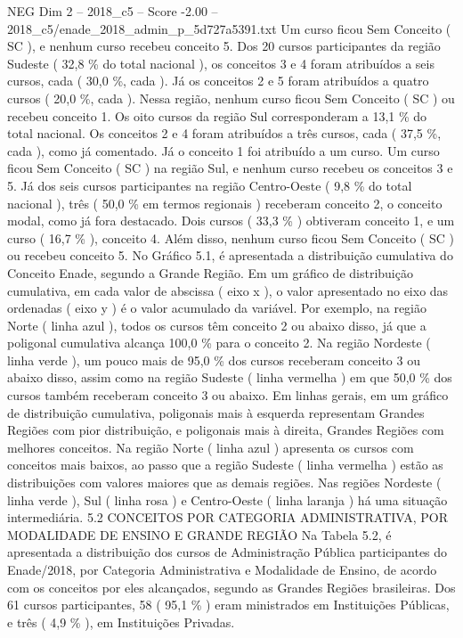 \begin{textsample}{NEG Dim 2 – 2018\_c5 – Score -2.00 – 2018\_c5/enade\_2018\_admin\_p\_5d727a5391.txt}
Um curso ficou Sem Conceito ( SC ), e nenhum curso recebeu conceito 5.
Dos 20 cursos participantes da região Sudeste ( 32,8 \% do total nacional ), os conceitos 3 e 4 foram atribuídos a seis cursos, cada ( 30,0 \%, cada ).
Já os conceitos 2 e 5 foram atribuídos a quatro cursos ( 20,0 \%, cada ).
Nessa região, nenhum curso ficou Sem Conceito ( SC ) ou recebeu conceito 1.
Os oito cursos da região Sul corresponderam a 13,1 \% do total nacional.
Os conceitos 2 e 4 foram atribuídos a três cursos, cada ( 37,5 \%, cada ), como já comentado.
Já o conceito 1 foi atribuído a um curso.
Um curso ficou Sem Conceito ( SC ) na região Sul, e nenhum curso recebeu os conceitos 3 e 5.
Já dos seis cursos participantes na região Centro-Oeste ( 9,8 \% do total nacional ), três ( 50,0 \% em termos regionais ) receberam conceito 2, o conceito modal, como já fora destacado.
Dois cursos ( 33,3 \% ) obtiveram conceito 1, e um curso ( 16,7 \% ), conceito 4.
Além disso, nenhum curso ficou Sem Conceito ( SC ) ou recebeu conceito 5.
No Gráfico 5.1, é apresentada a distribuição cumulativa do Conceito Enade, segundo a Grande Região.
Em um gráfico de distribuição cumulativa, em cada valor de abscissa ( eixo x ), o valor apresentado no eixo das ordenadas ( eixo y ) é o valor acumulado da variável.
Por exemplo, na região Norte ( linha azul ), todos os cursos têm conceito 2 ou abaixo disso, já que a poligonal cumulativa alcança 100,0 \% para o conceito 2.
Na região Nordeste ( linha verde ), um pouco mais de 95,0 \% dos cursos receberam conceito 3 ou abaixo disso, assim como na região Sudeste ( linha vermelha ) em que 50,0 \% dos cursos também receberam conceito 3 ou abaixo.
Em linhas gerais, em um gráfico de distribuição cumulativa, poligonais mais à esquerda representam Grandes Regiões com pior distribuição, e poligonais mais à direita, Grandes Regiões com melhores conceitos.
Na região Norte ( linha azul ) apresenta os cursos com conceitos mais baixos, ao passo que a região Sudeste ( linha vermelha ) estão as distribuições com valores maiores que as demais regiões.
Nas regiões Nordeste ( linha verde ), Sul ( linha rosa ) e Centro-Oeste ( linha laranja ) há uma situação intermediária. 5.2 CONCEITOS POR CATEGORIA ADMINISTRATIVA, POR MODALIDADE DE ENSINO E GRANDE REGIÃO Na Tabela 5.2, é apresentada a distribuição dos cursos de Administração Pública participantes do Enade/2018, por Categoria Administrativa e Modalidade de Ensino, de acordo com os conceitos por eles alcançados, segundo as Grandes Regiões brasileiras.
Dos 61 cursos participantes, 58 ( 95,1 \% ) eram ministrados em Instituições Públicas, e três ( 4,9 \% ), em Instituições Privadas.

\end{textsample}
